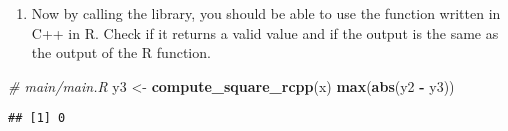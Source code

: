 \documentclass[
]{book}
\newenvironment{Shaded}{\begin{snugshade}}{\end{snugshade}}
\newcommand{\CommentTok}[1]{\textcolor[rgb]{0.56,0.35,0.01}{\textit{#1}}}
\newcommand{\FunctionTok}[1]{\textcolor[rgb]{0.13,0.29,0.53}{\textbf{#1}}}
\newcommand{\NormalTok}[1]{#1}
\newcommand{\OtherTok}[1]{\textcolor[rgb]{0.56,0.35,0.01}{#1}}
\newcommand{\SpecialCharTok}[1]{\textcolor[rgb]{0.81,0.36,0.00}{\textbf{#1}}}
\providecommand{\tightlist}{%
  \setlength{\itemsep}{0pt}\setlength{\parskip}{0pt}}
\begin{document}
\begin{enumerate}
\def\labelenumi{\arabic{enumi}.}
\setcounter{enumi}{10}
\tightlist
\item
  Now by calling the library, you should be able to use the function written in C++ in R. Check if it returns a valid value and if the output is the same as the output of the R function.
\end{enumerate}

\begin{Shaded}
\begin{Highlighting}[]
\CommentTok{\# main/main.R}
\NormalTok{y3 }\OtherTok{\textless{}{-}} \FunctionTok{compute\_square\_rcpp}\NormalTok{(x)}
\FunctionTok{max}\NormalTok{(}\FunctionTok{abs}\NormalTok{(y2 }\SpecialCharTok{{-}}\NormalTok{ y3))}
\end{Highlighting}
\end{Shaded}

\begin{verbatim}
## [1] 0
\end{verbatim}
\end{document}
